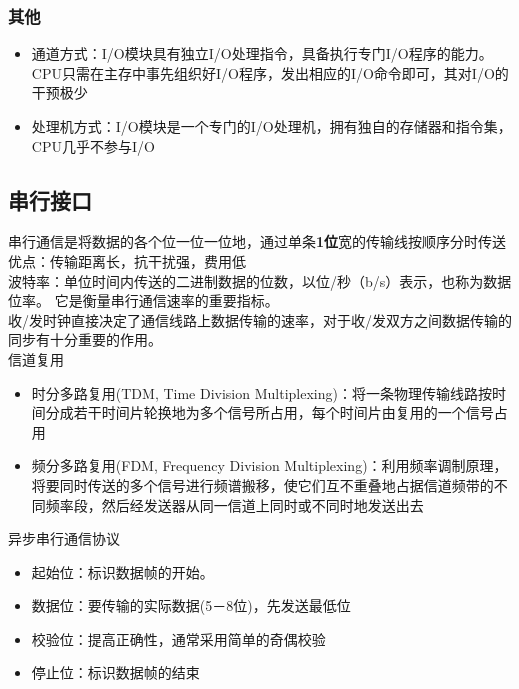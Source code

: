 \subsubsection{其他}
\begin{itemize}
	\item 通道方式：I/O模块具有独立I/O处理指令，具备执行专门I/O程序的能力。CPU只需在主存中事先组织好I/O程序，发出相应的I/O命令即可，其对I/O的干预极少
	\item 处理机方式：I/O模块是一个专门的I/O处理机，拥有独自的存储器和指令集，CPU几乎不参与I/O
\end{itemize}

\subsection{串行接口}
串行通信是将数据的各个位一位一位地，通过单条\textbf{1位}宽的传输线按顺序分时传送\\
优点：传输距离长，抗干扰强，费用低\\
波特率：单位时间内传送的二进制数据的位数，以位/秒（b/s）表示，也称为数据位率。 它是衡量串行通信速率的重要指标。\\
收/发时钟直接决定了通信线路上数据传输的速率，对于收/发双方之间数据传输的同步有十分重要的作用。\\
信道复用
\begin{itemize}
	\item 时分多路复用(TDM, Time Division Multiplexing)：将一条物理传输线路按时间分成若干时间片轮换地为多个信号所占用，每个时间片由复用的一个信号占用
	\item 频分多路复用(FDM, Frequency Division Multiplexing)：利用频率调制原理，将要同时传送的多个信号进行频谱搬移，使它们互不重叠地占据信道频带的不同频率段，然后经发送器从同一信道上同时或不同时地发送出去
\end{itemize}
异步串行通信协议
\begin{itemize}
	\item 起始位：标识数据帧的开始。
	\item 数据位：要传输的实际数据(5－8位)，先发送最低位
	\item 校验位：提高正确性，通常采用简单的奇偶校验
	\item 停止位：标识数据帧的结束
\end{itemize}
